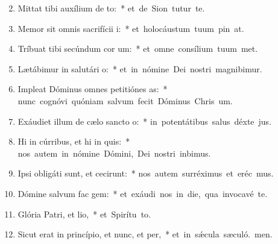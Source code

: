 \begin{flushleft}
\begin{enumerate}[leftmargin=*]
\setcounter{enumi}{1}

\item Mittat tibi auxílium de to:~* \mbox{et de Sion tutur te.}

\item Memor sit omnis sacrifícii i:~* \mbox{et holocáustum tuum pin at.}

\item Tríbuat tibi secúndum cor um:~* \mbox{et omne consílium tuum met.}

\item Lætábimur in salutári o:~* \mbox{et in nómine Dei nostri magnibimur.}

\item Impleat Dóminus omnes petitiónes as:~* \mbox{nunc cognóvi quóniam salvum fecit Dóminus Chris um.}

\item Exáudiet illum de cælo sancto o:~* \mbox{in potentátibus salus déxte jus.}

\item Hi in cúrribus, et hi in quis:~* \mbox{nos autem in nómine Dómini, Dei nostri inbimus.}

\item Ipsi obligáti sunt, et cecirunt:~* \mbox{nos autem surréximus et eréc mus.}

\item Dómine salvum fac gem:~* \mbox{et exáudi nos in die, qua invocavé te.}

\item Glória Patri, et lio,~* \mbox{et Spirítu to.}

\item Sicut erat in princípio, et nunc, et per,~* \mbox{et in sǽcula sæculó. men.}

\end{enumerate}
\end{flushleft}

